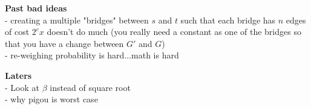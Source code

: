 \documentclass[11pt]{article}
\begin{document}
\textbf{Past bad ideas} \\
- creating a multiple "bridges" between $s$ and $t$ such that each bridge has
$n$ edges of cost $2^cx$ doesn't do much (you really need a constant as one of
the bridges so that you have a change between $G'$ and $G$) \\
- re-weighing probability is hard...math is hard

\textbf{Laters} \\
- Look at $\beta$ instead of square root \\
- why pigou is worst case


\nocite{Awerbuch2005}
\nocite{Christodoulou2005}
\nocite{Rieger2008}

\printbibliography
\end{document}
